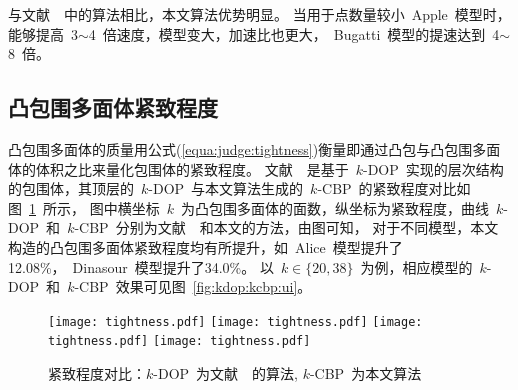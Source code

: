 与文献~~中的算法相比，本文算法优势明显。
当用于点数量较小~Apple~模型时，能够提高~3$\sim$4~倍速度，模型变大，加速比也更大，~Bugatti~模型的提速达到~4$\sim$8~倍。

\subsection{凸包围多面体紧致程度}
\label{subsec:exper:tightness}

凸包围多面体的质量用公式(\ref{equa:judge:tightness})衡量即通过凸包与凸包围多面体的体积之比来量化包围体的紧致程度。
文献~~是基于~$k$-DOP~实现的层次结构的包围体，其顶层的~$k$-DOP~与本文算法生成的~$k$-CBP~的紧致程度对比如图~\ref{chart:exps:tightness}~所示，
图中横坐标~$k$~为凸包围多面体的面数，纵坐标为紧致程度，曲线~$k$-DOP~和~$k$-CBP~分别为文献~~和本文的方法，由图可知，
对于不同模型，本文构造的凸包围多面体紧致程度均有所提升，如~Alice~模型提升了12.08\%，~Dinasour~模型提升了34.0\%。
以~$k \in \{20,38\}$~为例，相应模型的~$k$-DOP~和~$k$-CBP~效果可见图~\ref{fig:kdop:kcbp:ui}。

\begin{figure}[htbp] 
\centering
{}
{
    \texttt{[image: tightness.pdf]}
}
{  
   \texttt{[image: tightness.pdf]}
}
\linebreak
{}
{  
    \texttt{[image: tightness.pdf]}
}
{  
   \texttt{[image: tightness.pdf]}
}
\caption{紧致程度对比：$k$-DOP~为文献~~的算法, $k$-CBP~为本文算法}
\label{chart:exps:tightness}
\end{figure}

